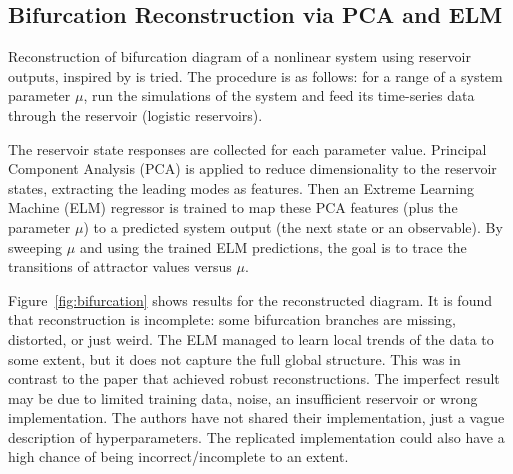 \documentclass[numbered]{ivt-style/standard}
\begin{document}



\subsection{Bifurcation Reconstruction via PCA and ELM}\label{BD_recon_section}
Reconstruction of bifurcation diagram of a nonlinear system using reservoir outputs, inspired by \cite{Itoh2020} is tried.  The procedure is as follows: for a range of a system parameter $\mu$, run the simulations of the system and feed its time-series data through the reservoir (logistic reservoirs).  

The reservoir state responses are collected for each parameter value. Principal Component Analysis (PCA) is applied to reduce dimensionality to the reservoir states, extracting the leading modes as features. Then an Extreme Learning Machine (ELM) regressor is trained to map these PCA features (plus the parameter $\mu$) to a predicted system output (the next state or an observable).  By sweeping $\mu$ and using the trained ELM predictions, the goal is to trace the transitions of attractor values versus $\mu$.  

Figure~\ref{fig:bifurcation} shows results for the reconstructed diagram.  It is found that reconstruction is incomplete: some bifurcation branches are missing, distorted, or just weird.  The ELM managed to learn local trends of the data to some extent, but it does not capture the full global structure. This was in contrast to the paper that achieved robust reconstructions.  The imperfect result may be due to limited training data, noise, an insufficient reservoir or wrong implementation. The authors have not shared their implementation, just a vague description of hyperparameters.  The replicated implementation could also have a high chance of being incorrect/incomplete to an extent. 
\end{document}
